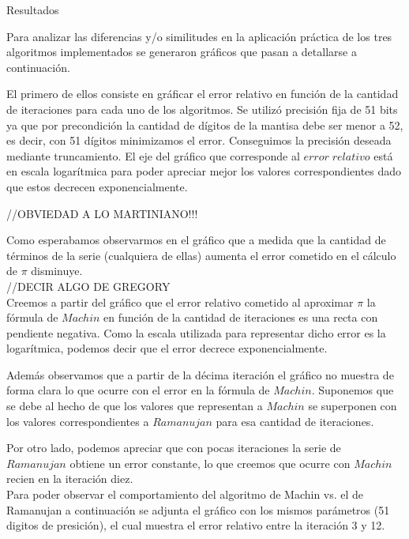 \begin{section}{Resultados}

	Para analizar las diferencias y/o similitudes en la aplicación práctica de los tres algoritmos implementados se generaron gráficos que pasan a detallarse a continuación. 
		
	El primero de ellos consiste en gráficar el error relativo en función de la cantidad de iteraciones para cada uno de los algoritmos. Se utilizó precisión fija de 51 bits ya que por precondición la cantidad de dígitos de la mantisa debe ser menor a 52, es decir, con 51 dígitos minimizamos el error. Conseguimos la precisión deseada mediante truncamiento.
	El eje del gráfico que corresponde al $error\;relativo$ está en escala logarítmica para poder apreciar mejor los valores correspondientes dado que estos decrecen exponencialmente.
	


	//OBVIEDAD A LO MARTINIANO!!!

	Como esperabamos observarmos en el gráfico que a medida que la cantidad de términos de la serie (cualquiera de ellas) aumenta el error cometido en el cálculo de $\pi$ disminuye.\\
	
	//DECIR ALGO DE GREGORY\\
	
	Creemos a partir del gráfico que el error relativo cometido al aproximar $\pi$ la fórmula de $Machin$ en función de la cantidad de iteraciones es una recta con pendiente negativa. Como la escala utilizada para representar dicho error es la logarítmica, podemos decir que el error decrece exponencialmente.
	
	Además observamos que a partir de la décima iteración el gráfico no muestra de forma clara lo que ocurre con el error en la fórmula de $Machin$. Suponemos que se debe al hecho de que los valores que representan a $Machin$ se superponen con los valores correspondientes a $Ramanujan$ para esa cantidad de iteraciones.
	
	Por otro lado, podemos apreciar que con pocas iteraciones la serie de $Ramanujan$ obtiene un error constante, lo que creemos que ocurre con $Machin$ recien en la iteración diez.\\
	
	Para poder observar el comportamiento del algoritmo de Machin vs. el de Ramanujan a continuación se adjunta el gráfico con los mismos parámetros (51 digitos de presición), el cual muestra el error relativo entre la iteración 3 y 12.


\end{section}
